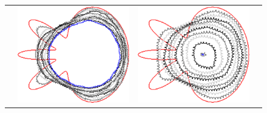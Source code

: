 \begin{figure}
\begin{tabular}{p{2.5em}ccc}
& \includegraphics[scale=0.24]{figures/chapter6/radius-effect/flower/improve/len_pen0/radius-3/summary.pdf} &
\includegraphics[scale=0.24]{figures/chapter6/radius-effect/flower/improve/len_pen0/radius-5/summary.pdf} &

\end{tabular}
\end{figure}

